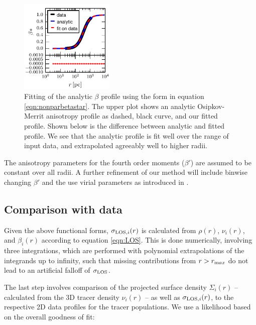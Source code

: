 \begin{figure}
    \begin{center}
        \hspace{-7mm}
        \includegraphics[width=0.4\textwidth]{fig/beta_fit_all.pdf}
        \caption{Fitting of the analytic $\beta$ profile using the form in
          equation \ref{eqn:nonparbetastar}. The upper plot shows an analytic
          Osipkov-Merrit anisotropy profile as dashed, black curve, and our
          fitted profile. Shown below is the difference between analytic and
          fitted profile. We see that the analytic profile is fit well over the
          range of input data, and extrapolated agreeably well to higher radii.}
        \label{fig:betafitting}
    \end{center}
\end{figure}

The anisotropy parameters for the fourth order moments ($\beta'$) are assumed to
be constant over all radii. A further refinement of our method will include
binwise changing $\beta'$ and the use virial parameters as introduced in
\cite{RichardsonFairbairn2014}.

\subsection{Comparison with data}\label{sec:datacompare}

Given the above functional forms, $\sigma_{\text{LOS},i}(r)$ is calculated from $\rho(r)$,
$\nu_i(r)$, and $\beta_i(r)$ according to equation \ref{eqn:LOS}. This is done
numerically, involving three integrations, which are performed with polynomial
extrapolations of the integrands up to infinity, such that missing contributions
from $r>r_{\text max}$ do not lead to an artificial falloff of $\sigma_{\text{LOS}}$.

The last step involves comparison of the projected surface density $\Sigma_i(r)$
-- calculated from the 3D tracer density $\nu_i(r)$ -- as well as $\sigma_{{\rm
    LOS},i}(r)$, to the respective 2D data profiles for the tracer
populations. We use a likelihood based on the overall goodness of fit:

